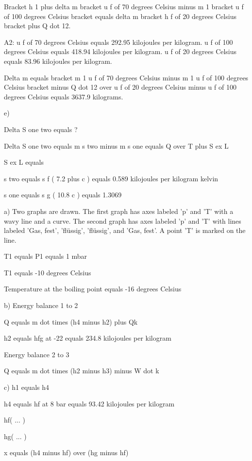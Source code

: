 Bracket h 1 plus delta m bracket u f of 70 degrees Celsius minus m 1 bracket u f of 100 degrees Celsius bracket equals delta m bracket h f of 20 degrees Celsius bracket plus Q dot 12.

A2: u f of 70 degrees Celsius equals 292.95 kilojoules per kilogram. u f of 100 degrees Celsius equals 418.94 kilojoules per kilogram. u f of 20 degrees Celsius equals 83.96 kilojoules per kilogram.

Delta m equals bracket m 1 u f of 70 degrees Celsius minus m 1 u f of 100 degrees Celsius bracket minus Q dot 12 over u f of 20 degrees Celsius minus u f of 100 degrees Celsius equals 3637.9 kilograms.

e)

Delta S one two equals ?

Delta S one two equals m s two minus m s one equals Q over T plus S ex L

S ex L equals

s two equals s f ( 7.2 plus c ) equals 0.589 kilojoules per kilogram kelvin

s one equals s g ( 10.8 c ) equals 1.3069

a) Two graphs are drawn. The first graph has axes labeled 'p' and 'T' with a wavy line and a curve. The second graph has axes labeled 'p' and 'T' with lines labeled 'Gas, fest', 'flüssig', 'flüssig', and 'Gas, fest'. A point 'T' is marked on the line.

T1 equals P1 equals 1 mbar

T1 equals -10 degrees Celsius

Temperature at the boiling point equals -16 degrees Celsius

b) Energy balance 1 to 2

Q equals m dot times (h4 minus h2) plus Qk

h2 equals hfg at -22 equals 234.8 kilojoules per kilogram

Energy balance 2 to 3

Q equals m dot times (h2 minus h3) minus W dot k

c) h1 equals h4

h4 equals hf at 8 bar equals 93.42 kilojoules per kilogram

hf( ... )

hg( ... )

x equals (h4 minus hf) over (hg minus hf)